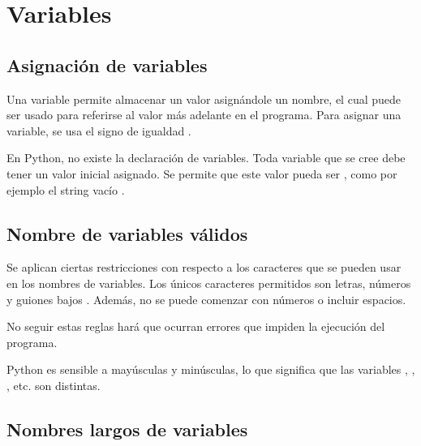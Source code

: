 \chapter{Variables}

\section{Asignación de variables}

Una variable permite almacenar un valor asignándole un nombre, el cual puede ser usado para referirse al valor más adelante en el programa. Para asignar una variable, se usa el signo de igualdad \ttt{=}.


En Python, no existe la declaración de variables. Toda variable que se cree debe tener un valor inicial asignado. Se permite que este valor pueda ser , como por ejemplo el string vacío \ttt{\qq \qq}.

\section{Nombre de variables válidos}

Se aplican ciertas restricciones con respecto a los caracteres que se pueden usar en los nombres de variables. Los únicos caracteres permitidos son letras, números y guiones bajos \ttt{\_}. Además, no se puede comenzar con números o incluir espacios.\smallskip

No seguir estas reglas hará que ocurran errores que impiden la ejecución del programa.




Python es sensible a mayúsculas y minúsculas, lo que significa que las variables , , , etc. son distintas.


\section{Nombres largos de variables}


